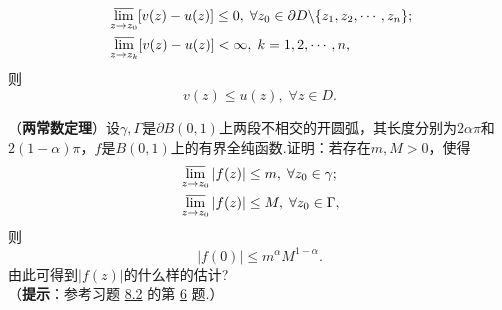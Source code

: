 \begin{xiti}
\begin{align*}
&\varlimsup_{z\to z_0}[v(z)-u(z)]\le0,\;\forall z_0\in\partial D\backslash\{z_1,z_2,\cdots,z_n\};\\
&\varlimsup_{z\to z_k}[v(z)-u(z)]<\infty,\;k=1,2,\cdots,n,
\end{align*}
则
\[v(z)\le u(z),\;\forall z\in D.\]
\item （\textbf{两常数定理}）设$\gamma,\Gamma$是$\partial B(0,1)$上两段不相交的开圆弧，其长度分别为$2\alpha\pi$和$2(1-\alpha)\pi$，$f$是$B(0,1)$上的有界全纯函数.证明：若存在$m,M>0$，使得
    \begin{align*}
    &\varlimsup_{z\to z_0}|f(z)|\le m,\;\forall z_0\in\gamma;\\
    &\varlimsup_{z\to z_0}|f(z)|\le M,\;\forall z_0\in\Gamma,
    \end{align*}
则
\[|f(0)|\le m^\alpha M^{1-\alpha}.\]
由此可得到$|f(z)|$的什么样的估计?\\
（\textbf{提示}：参考习题 \hyperlink{xiti8.2}{8.2} 的第 \hyperlink{xiti8.2.6}{6} 题.）
\end{xiti}
